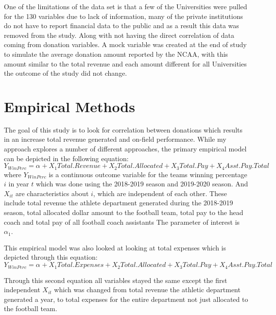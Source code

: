\documentclass[12pt,english]{article}
\begin{document}
One of the limitations of the data set is that a few of the Universities were pulled for the 130 variables due to lack of information, many of the private institutions do not have to report financial data to the public and as a result this data was removed from the study. Along with not having the direct correlation of data coming from donation variables. A mock variable was created at the end of study to simulate the average donation amount reported by the NCAA, with this amount similar to the total revenue and each amount different for all Universities the outcome of the study did not change. 



\section{Empirical Methods}\label{sec:methods}
The goal of this study is to look for correlation between donations which results in an increase total revenue generated and on-field performance. While my approach explores a number of different approaches, the primary empirical model can be depicted in the following equation:
\begin{equation}
\label{eq:1}
Y_{WinPerc}= \alpha_{} + X_{1}{Total.Revenue}+X_{2}{Total.Allocated}+X_{3}{Total.Pay}+X_{4}{Asst.Pay.Total}
\end{equation}
where $Y_{WinPerc}$ is a continuous outcome variable for the teams winning percentage $i$ in year $t$ which was done using the 2018-2019 season and 2019-2020 season. And $X_{it}$ are characteristics about $i$, which are independent of each other. These include total revenue the athlete department generated during the 2018-2019 season, total allocated dollar amount to the football team, total pay to the head coach and total pay of all football coach assistants The parameter of interest is $\alpha_{1}$.

This empirical model was also looked at looking at total expenses which is depicted through this equation: 
\begin{equation}
\label{eq:2}
Y_{WinPerc}= \alpha_{} + X_{1}{Total.Expenses}+X_{2}{Total.Allocated}+X_{3}{Total.Pay}+X_{4}{Asst.Pay.Total}
\end{equation}

Through this second equation all variables stayed the same except the first independent $X_{it}$ which was changed from total revenue the athletic department generated a year, to total expenses for the entire department not just allocated to the football team. 
\end{document}
